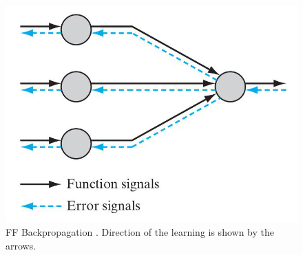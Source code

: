 \begin{figure}[!htb]
\centering
\includegraphics[width=.50\columnwidth]{images/112ffbp}
\caption[\acs{FF} Backpropagation]{\acs{FF} Backpropagation
\cite{RefWorks:158}. Direction of the learning is shown by the arrows.}
\label{fig:112ffbp}
\end{figure}